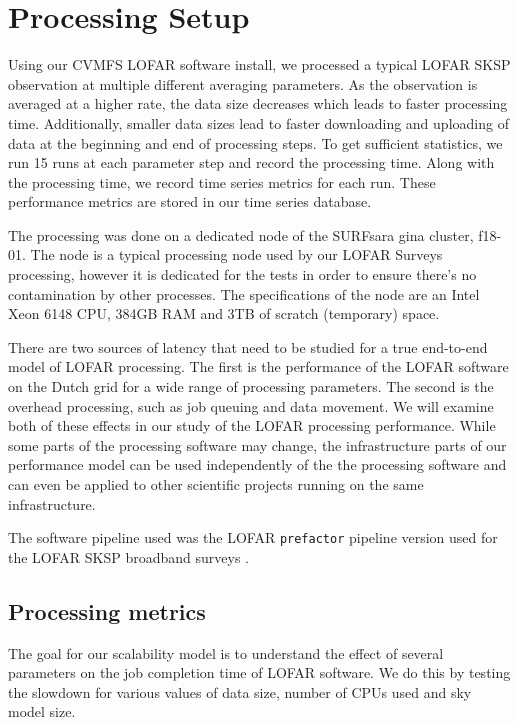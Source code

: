 \section{Processing Setup }\label{sec:methods}
Using our CVMFS LOFAR software install, we processed a typical LOFAR SKSP observation at multiple different averaging parameters. As the observation is averaged at a higher rate, the data size decreases which leads to faster processing time. Additionally, smaller data sizes lead to faster downloading and uploading of data at the beginning and end of processing steps. To get sufficient statistics, we run 15 runs at each parameter step and record the processing time. Along with the processing time, we record time series metrics for each run. These performance metrics are stored in our time series database. 

The processing was done on a dedicated node of the SURFsara gina cluster, f18-01. The node is a typical processing node used by our LOFAR Surveys processing, however it is dedicated for the tests in order to ensure there's no contamination by other processes. The specifications of the node are an Intel Xeon 6148 CPU, 384GB RAM and 3TB of scratch (temporary) space. 

There are two sources of latency that need to be studied for a true end-to-end model of LOFAR processing. The first is the performance of the LOFAR software on the Dutch grid for a wide range of processing parameters. The second is the overhead processing, such as job queuing and data movement. We will examine both of these effects in our study of the LOFAR processing performance. While some parts of the processing software may change, the infrastructure parts of our performance model can be used independently of the the processing software and can even be applied to other scientific projects running on the same infrastructure. 

The software pipeline used was the LOFAR \texttt{prefactor} pipeline version used for the LOFAR SKSP broadband surveys \citep{prefactor_zenodo}. 

\subsection{Processing metrics}
The goal for our scalability model is to understand the effect of several parameters on the job completion time of LOFAR software. We do this by testing the slowdown for various values of data size, number of CPUs used and sky model size. 

